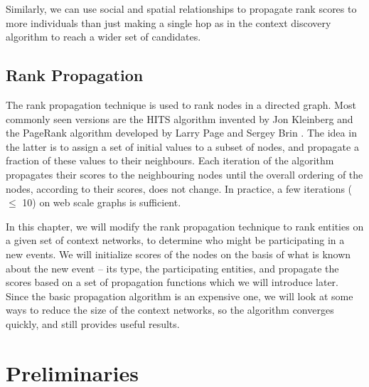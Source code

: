 Similarly, we can use social and spatial relationships to propagate rank scores to more individuals than just making a single hop as in the context discovery algorithm to reach a wider set of candidates.

\subsection{Rank Propagation}

The rank propagation technique is used to rank nodes in a directed graph. Most commonly seen versions are the HITS algorithm invented by Jon Kleinberg \cite{kleinberg1999authoritative} and the PageRank algorithm developed by Larry Page and Sergey Brin \cite{page1999pagerank}. The idea in the latter is to assign a set of initial values to a subset of nodes, and propagate a fraction of these values to their neighbours. Each iteration of the algorithm propagates their scores to the neighbouring nodes until the overall ordering of the nodes, according to their scores, does not change. In practice, a few iterations ($\leq$ 10) on web scale graphs is sufficient.

In this chapter, we will modify the rank propagation technique to rank entities on a given set of context networks, to determine who might be participating in a new events. We will initialize scores of the nodes on the basis of what is known about the new event -- its type, the participating entities, and propagate the scores based on a set of propagation functions which we will introduce later. Since the basic propagation algorithm is an expensive one, we will look at some ways to reduce the size of the context networks, so the algorithm converges quickly, and still provides useful results.

\section{Preliminaries}


